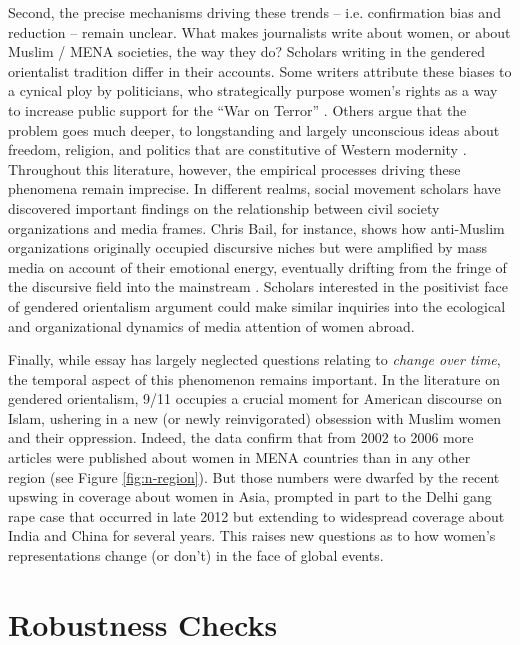 \documentclass[11pt, oneside]{article}
\begin{document}
Second, the precise mechanisms driving these trends -- i.e. confirmation bias and reduction -- remain unclear. What makes journalists write about women, or about Muslim / MENA societies, the way they do? Scholars writing in the gendered orientalist tradition differ in their accounts. Some writers attribute these biases to a cynical ploy by politicians, who strategically purpose women's rights as a way to increase public support for the ``War on Terror'' \cite{stabile_unveiling_2005}. Others argue that the problem goes much deeper, to longstanding and largely unconscious ideas about freedom, religion, and politics that are constitutive of Western modernity \cite{massad2015islam}. Throughout this literature, however, the empirical processes driving these phenomena remain imprecise. In different realms, social movement scholars have discovered important findings on the relationship between civil society organizations and media frames. Chris Bail, for instance, shows how anti-Muslim organizations originally occupied discursive niches but were amplified by mass media on account of their emotional energy, eventually drifting from the fringe of the discursive field into the mainstream \citeyear{bail2012fringe}. Scholars interested in the positivist face of gendered orientalism argument could make similar inquiries into the ecological and organizational dynamics of media attention of women abroad. 

Finally, while essay has largely neglected questions relating to \emph{change over time}, the temporal aspect of this phenomenon remains important. In the literature on gendered orientalism, 9/11 occupies a crucial moment for American discourse on Islam, ushering in a new (or newly reinvigorated) obsession with Muslim women and their oppression. Indeed, the data confirm that from 2002 to 2006 more articles were published about women in MENA countries than in any other region (see Figure \ref{fig:n-region}). But those numbers were dwarfed by the recent upswing in coverage about women in Asia, prompted in part to the Delhi gang rape case that occurred in late 2012 but extending to widespread coverage about India and China for several years. This raises new questions as to how women's representations change (or don't) in the face of global events.

\newpage



\newpage

\appendix

\section{Robustness Checks}
\end{document}
